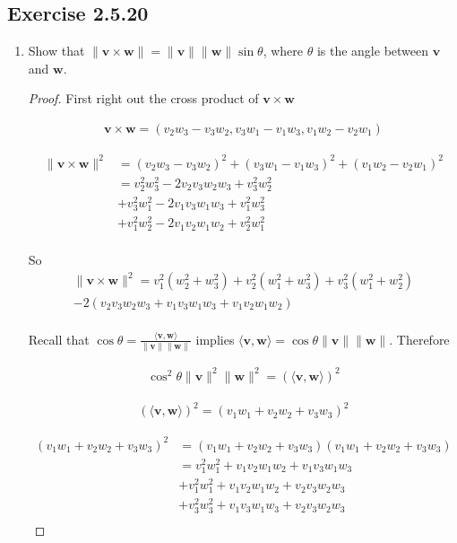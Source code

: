\documentclass{tufte-book}
\newcommand{\vct}{\mathbf}
\newcommand{\dprod}[2]{\langle #1, #2 \rangle}
\theoremstyle{mytheoremstyle}
\theoremstyle{mylemstyle}
\theoremstyle{mydefstyle}
\begin{document}
\subsection{Exercise 2.5.20}
\begin{enumerate}
\item Show that $\|\vct{v} \times \vct{w} \| = \|\vct{v}\|\|\vct{w}\|\sin \theta$, where $\theta$ is the angle between $\vct{v}$ and $\vct{w}$.

\begin{proof}

First right out the cross product of $\vct{v} \times \vct{w}$

\begin{align}
\vct{v} \times \vct{w} = (v_2w_3 - v_3w_2, v_3w_1 - v_1w_3, v_1w_2 - v_2w_1)
\end{align}

\begin{align*}
\|\vct{v} \times \vct{w} \|^2 &= (v_2w_3 - v_3w_2)^2+(v_3w_1 - v_1w_3)^2+(v_1w_2 - v_2w_1)^2\\
&=v_2^2w_3^2 - 2v_2v_3w_2w_3 + v_3^2w_2^2 \\
&+ v_3^2w_1^2 - 2v_1v_3w_1w_3 + v_1^2w_3^2 \\
&+ v_1^2w_2^2 - 2v_1v_2w_1w_2 + v_2^2w_1^2 \\
\end{align*}

So
\begin{multline}
\|\vct{v} \times \vct{w} \|^2 = v_1^2(w_2^2 + w_3^2) + v_2^2(w_1^2+w_3^2) + v_3^2(w_1^2+w_2^2)\\ 
-2(v_2v_3w_2w_3 + v_1v_3w_1w_3 + v_1v_2w_1w_2)\\
\end{multline}

Recall that $\cos \theta = \frac{\dprod{\vct{v}}{\vct{w}}}{\|\vct{v}\|\|\vct{w}\|}$ implies $\dprod{\vct{v}}{\vct{w}} = \cos\theta \|\vct{v}\|\|\vct{w}\|$.  Therefore

\begin{align}
\cos^2\theta \|\vct{v}\|^2\|\vct{w}\|^2 = (\dprod{\vct{v}}{\vct{w}})^2
\end{align}

\begin{align}
(\dprod{\vct{v}}{\vct{w}})^2 = (v_1w_1 + v_2w_2 + v_3w_3)^2
\end{align}

\begin{align*}
(v_1w_1 + v_2w_2 + v_3w_3)^2 &= (v_1w_1 + v_2w_2 + v_3w_3)(v_1w_1 + v_2w_2 + v_3w_3)\\
&= v_1^2w_1^2 + v_1v_2w_1w_2 + v_1v_3w_1w_3 \\
&+ v_1^2w_1^2 + v_1v_2w_1w_2 + v_2v_3w_2w_3 \\
&+ v_3^2w_3^2 + v_1v_3w_1w_3 + v_2v_3w_2w_3 \\
\end{align*}


\end{proof}
\end{enumerate}
\end{document}
